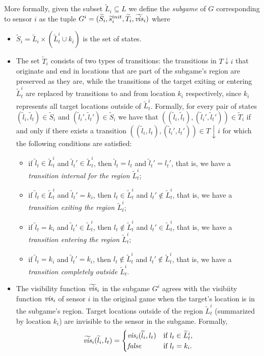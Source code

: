 More formally, given the subset  $\widetilde{L}_i \subseteq L$ we define the \emph{subgame} of $G$ corresponding to sensor $i$ as the tuple $G^i = (\widetilde{S}_i,\widetilde{s}_i^{init},\widetilde{T}_i,\widetilde{\mathit{vis}}_i)$  where
\begin{itemize}
\item $\widetilde{S}_i= \widetilde{L}_i \times (\widetilde{L}^i_t \cup k_i)$ is the set of states.
\item The set $\widetilde{T}_i$ consists of two types of transitions: the transitions in $T{\downarrow } i$ that originate and end in locations that are part of the subgame's region are preserved as they are, while the transitions of the target exiting or entering $\widetilde{L}^i_t$ are replaced by transitions to and from location $k_i$ respectively, since $k_i$ represents all target locations outside of  $\widetilde{L}^i_t$. 
Formally, for every pair of states $(\widetilde{l}_i,\widetilde{l}_t) \in \widetilde{S}_i$ and $(\widetilde{l}_i',\widetilde{l}_t') \in \widetilde{S}_i$ we have that $((\widetilde{l}_i,\widetilde l_t),(\widetilde{l}_i',\widetilde l_t')) \in \widetilde T_i$ if and only if there exists a transition
 $((\widetilde{l}_i,l_t),(\widetilde{l}_i',l_t')) \in T{\downarrow}i$ for which the following conditions are satisfied:
 \begin{itemize}
 \item if $\widetilde l_t \in \widetilde L_t ^i$ and $\widetilde l_t' \in \widetilde L_t ^i$, then 
 $\widetilde l_t = l_t$ and $\widetilde l_t'= l_t'$, that is, we have a \emph{transition internal for the region $\widetilde L_t^i$};
 \item if $\widetilde l_t \in \widetilde L_t ^i$ and $\widetilde l_t' =  k_i$, then 
 $l_t \in \widetilde L_t^i$ and $l_t' \not\in \widetilde L_t^i$, that is, we have a \emph{transition exiting the region $\widetilde L_t^i$}; 
 \item if $\widetilde l_t= k_i$ and $\widetilde l_t' \in  \widetilde L_t ^i$, then 
 $l_t \not \in \widetilde L_t^i$ and $l_t' \in \widetilde L_t^i$, that is, we have a \emph{transition entering the region $\widetilde L_t^i$}; 
 \item if $\widetilde l_t= k_i$ and $\widetilde l_t' =  k_i$, then 
 $l_t \not \in \widetilde L_t^i$ and $l_t' \not\in \widetilde L_t^i$, that is, we have a \emph{transition completely outside $\widetilde L_t^i$}.
\end{itemize}  

  \item The visibility function $\widetilde{\mathit{vis}}_i$ in the subgame $G^i$ agrees with the visibiity function $\mathit{vis}_i$ of sensor $i$ in the original game when the target's location is in the subgame's region. Target locations outside of the region $\widetilde L_t^i$  (summarized by location $k_i$) are invisible to the sensor in the subgame. Formally, 
 \[\widetilde{\mathit{vis}}_i(\widetilde{l}_i,l_t) = \begin{cases}
\mathit{vis}_i(\widetilde{l}_i,l_t) & \text{if } l_t \in \widetilde{L}_t^i, \\
\mathit{false} & \text{if } l_t  = k_i.
\end{cases}
\]
\end{itemize}
